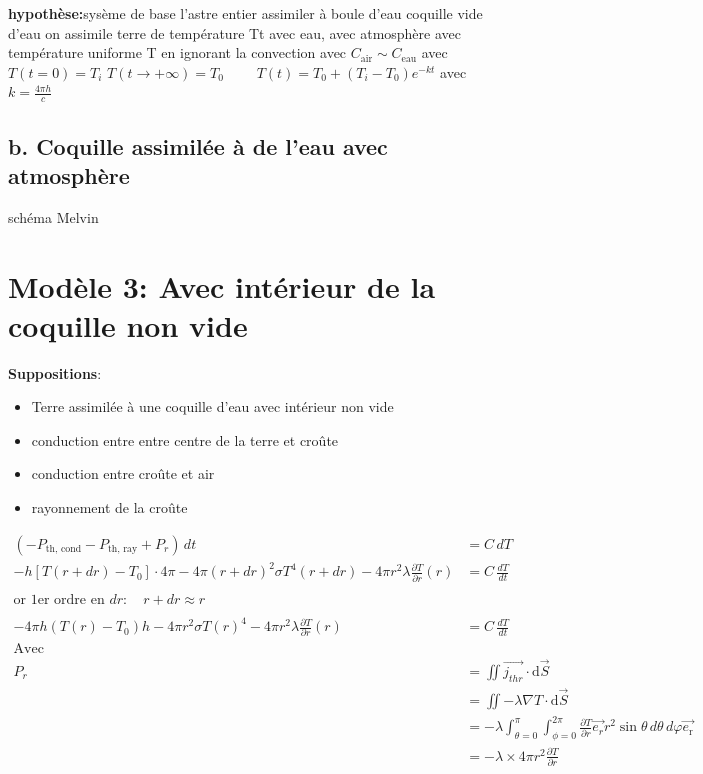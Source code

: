 \documentclass[a4paper,12pt]{article}
\begin{document}
\vspace{0.5cm}
\textbf{hypothèse:}sysème de base l'astre entier assimiler à boule d'eau 
coquille vide d'eau 
on assimile terre de température Tt avec eau, avec atmosphère avec température uniforme T  en ignorant la convection 
avec \(C_{\text{air}}\sim C_{\text{eau}}\)
avec  $T(t=0) = T_i$ 
$T(t \to +\infty) = T_0$  \ \ \ \
$T(t) = T_0 + (T_i - T_0)e^{-kt}$ \quad avec $k = \frac{4\pi h}{c}$
\subsection{b. Coquille assimilée à de l'eau avec atmosphère }
schéma Melvin

\section{Modèle 3: Avec intérieur de la coquille non vide }
\textbf{Suppositions}:
\begin{itemize}
    \item Terre assimilée à une coquille d'eau avec intérieur non vide 
    \item  conduction entre entre centre de la terre et croûte 
    \item  conduction entre croûte et air 
    \item  rayonnement de la croûte
    
    
    
\end{itemize}

\begin{align*}
(-P_{\text{th, cond}} - P_{\text{th, ray}} + P_r) \, dt &= C \, dT \\
-h\left[T(r + dr) - T_0\right] \cdot 4\pi - 4\pi  (r + dr)^2 \sigma T^4(r+dr) - 4\pi r^2 \lambda \frac{\partial T}{\partial r}(r) &= C \, \frac{dT}{dt} \\
\\
\text{or 1er ordre en } dr: \quad r + dr \approx r \\
\\
-4\pi h(T(r) - T_0)h-4\pi r^2 \sigma T(r)^4 - 4\pi r^2 \lambda \frac{\partial T}{\partial r}(r) &= C \, \frac{dT}{dt}
\\
\text{Avec }  
\\
P_{r} &= \iint \vec{j_{thr}} \cdot \mathrm{d}\vec{S} \\
&= \iint -\lambda \nabla T \cdot \mathrm{d}\vec{S} \\
&= -\lambda \int_{\theta=0}^\pi \int_{\phi=0}^{2\pi} \frac{\partial T}{\partial r} \vec{e_{r}}r^2\sin\theta\, d\theta\, d\varphi \vec{e_{\text{r}}}\\
&= -\lambda \times 4\pi r^2 \frac{\partial T}{\partial r}
\end{align*}

 
\vspace{1cm}
\end{document}
